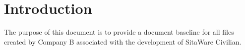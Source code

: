 \chapter{Introduction}

The purpose of this document is to provide a document baseline for all files created by Company B associated with the development of SitaWare Civilian.


